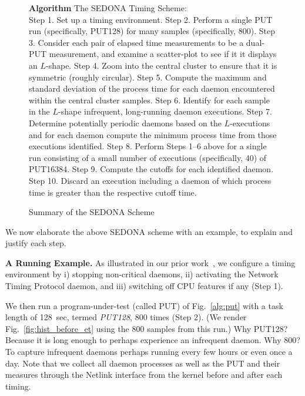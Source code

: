 \documentclass[letter]{ieice}
\begin{document}
\begin{figure}[h]
\begin{center}
\begin{algorithmic}
{\bf Algorithm} The SEDONA Timing Scheme: \\
\STATE Step 1. Set up a timing environment.
\STATE Step 2. Perform a single PUT run (specifically, PUT128) for many samples (specifically, 800).
\STATE Step 3. Consider each pair of elapsed time measurements to be a dual-PUT measurement, 
and examine a scatter-plot to see if it it displays an $L$-shape.
\STATE Step 4. Zoom into the central cluster to ensure that it is symmetric (roughly circular).
\STATE Step 5. Compute the maximum and standard deviation of the process time 
for each daemon encountered within the central cluster samples.
\STATE Step 6. Identify for each sample in the $L$-shape infrequent, long-running daemon executions. 
\STATE Step 7. Determine potentially periodic daemons based on the $L$-executions 
and for each daemon compute the minimum process time from those executions identified. 
\STATE Step 8. Perform Steps 1--6 above for a single run 
consisting of a small number of executions (specifically, 40) of PUT16384.  
\STATE Step 9. Compute the cutoffs for each identified daemon. 
\STATE Step 10. Discard an execution including a daemon of which process time is greater than 
the respective cutoff time.
\end{algorithmic}
\end{center}
\caption{Summary of the SEDONA Scheme\label{alg:find}}
\vspace{-0.28in}
\end{figure}
%

We now elaborate the above SEDONA scheme with an example, to explain and justify each step.

{\bf A Running Example.} 
As illustrated in our prior work~\cite{Currim}, 
we configure a timing environment by i) stopping non-critical daemons, 
ii) activating the Network Timing Protocol daemon, and 
iii) switching off CPU features\cite{intel15,intelSpeed15} if any (Step 1). 

We then run a program-under-test (called PUT) of 
Fig.~\ref{alg:put} with a task length of 128~sec, 
termed {\em PUT128}, 800 times (Step 2). 
(We render Fig.~\ref{fig:hist_before_et} using the 800 samples from this run.)
Why PUT128? Because it is long enough to perhaps experience an infrequent daemon. 
Why 800? To capture infrequent daemons perhaps running every few hours or even 
once a day. 
Note that we collect all daemon processes as well as the PUT and their measures 
through the Netlink interface from the kernel before and after each 
timing.
\end{document}
